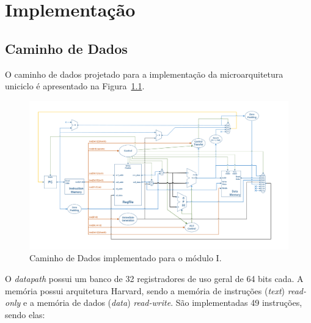 \chapter{Implementação}\label{CapImpl}



    \section{Caminho de Dados}

        {O caminho de dados projetado para a implementação da microarquitetura uniciclo é apresentado na Figura~\ref{fig:datapath}.}

        \begin{figure}[H]
        \centering
            \includegraphics[width=1\linewidth]{figs/singlecycle.png}
            \caption{Caminho de Dados implementado para o módulo I.}\label{fig:datapath}
        \end{figure}

        {O \textit{datapath} possui um banco de 32 registradores de uso geral de 64 bits cada. A memória possui arquitetura Harvard, sendo a memória de instruções (\textit{text}) \textit{read-only} e a memória de dados (\textit{data}) \textit{read-write}. São implementadas 49 instruções, sendo elas:}

